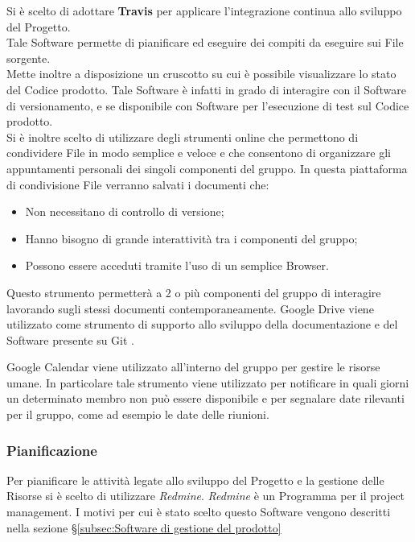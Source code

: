 
Si è scelto di adottare \textbf{Travis} per applicare l’integrazione continua allo sviluppo del Progetto.\\ 
Tale Software permette di pianificare ed eseguire dei compiti da eseguire sui File sorgente.\\
Mette inoltre a disposizione un cruscotto su cui è possibile visualizzare lo stato del Codice prodotto. Tale Software è infatti in grado di interagire con il Software di versionamento, e se disponibile con Software per l’esecuzione di test sul Codice prodotto.\\ 



  \label{sec:condivisioneFile}
  Si è inoltre scelto di utilizzare degli strumenti online che permettono di condividere File
  in modo semplice e veloce e che consentono di organizzare gli appuntamenti personali
  dei singoli componenti del gruppo.
  In questa piattaforma di condivisione File verranno salvati i documenti che:
  \begin{itemize}
  
  
  \item Non necessitano di controllo di versione;
  \item Hanno bisogno di grande interattività tra i componenti del gruppo;
  \item Possono essere acceduti tramite l’uso di un semplice Browser.
   \end{itemize}
  Questo strumento permetterà a 2 o più componenti del gruppo di interagire lavorando sugli stessi documenti contemporaneamente. Google Drive viene utilizzato come strumento di supporto allo sviluppo della documentazione e del Software presente su Git .
  


 
Google Calendar viene utilizzato all’interno del gruppo per gestire le risorse umane. In
particolare tale strumento viene utilizzato per notificare in quali giorni un determinato
membro non può essere disponibile e per segnalare date rilevanti per il gruppo, come
ad esempio le date delle riunioni.
\subsubsection{Pianificazione}
\label{sec:Pianificazione}
Per pianificare le attività legate allo sviluppo del Progetto e la gestione delle Risorse si è scelto di utilizzare \emph{Redmine}.
\emph{Redmine} è un Programma per il project management. I motivi per cui è stato scelto questo Software vengono descritti nella sezione \S\ref{subsec:Software di gestione del prodotto}


